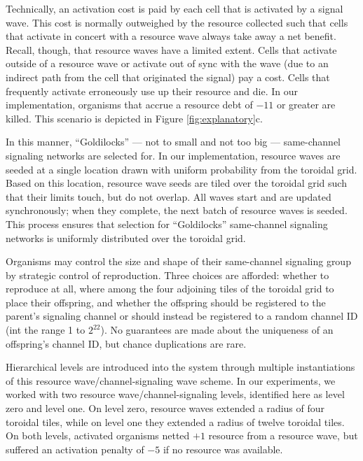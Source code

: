 Technically, an activation cost is paid by each cell that is activated by a signal wave.
This cost is normally outweighed by the resource collected such that cells that activate in concert with a resource wave always take away a net benefit.
Recall, though, that resource waves have a limited extent.
Cells that activate outside of a resource wave or activate out of sync with the wave (due to an indirect path from the cell that originated the signal) pay a cost.
Cells that frequently activate erroneously use up their resource and die.
In our implementation, organisms that accrue a resource debt of $-11$ or greater are killed.
This scenario is depicted in Figure \ref{fig:explanatory}c.

In this manner, ``Goldilocks'' --- not to small and not too big --- same-channel signaling networks are selected for.
In our implementation, resource waves are seeded at a single location drawn  with uniform probability from the toroidal grid.
Based on this location, resource wave seeds are tiled over the toroidal grid
such that their limits touch, but do not overlap.
All waves start and are updated synchronously; when they complete,
the next batch of resource waves is seeded.
This process ensures that selection for ``Goldilocks'' same-channel signaling networks is uniformly distributed over the toroidal grid.

Organisms may control the size and shape of their same-channel signaling group by strategic control of reproduction.
Three choices are afforded: whether to reproduce at all, where among the four adjoining tiles of the toroidal grid to place their offspring, and whether the offspring should be registered to the parent's signaling channel or should instead be registered to a random channel ID (int the range 1 to $2^{22}$). %
No guarantees are made about the uniqueness of an offspring's channel ID, but chance duplications are rare. %

Hierarchical levels are introduced into the system through multiple instantiations of this resource wave/channel-signaling wave scheme.
In our experiments, we worked with two resource wave/channel-signaling levels, identified here as level zero and level one.
On level zero, resource waves extended a radius of four toroidal tiles, while on level one they extended a radius of twelve toroidal tiles.  On both levels, activated organisms netted $+1$ resource from a resource wave, but suffered an activation penalty of $-5$ if no resource was available.

